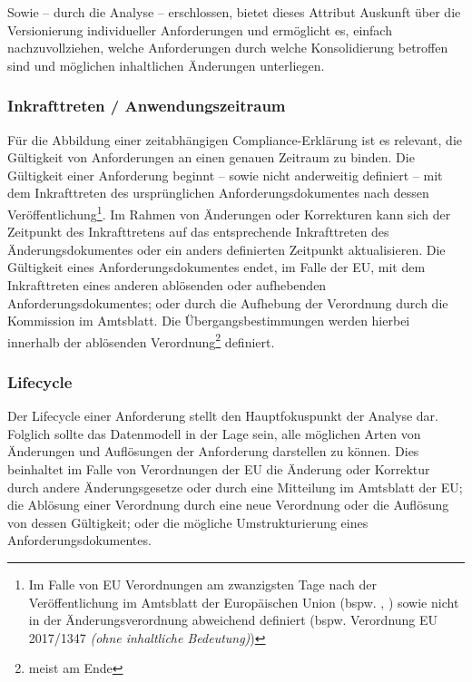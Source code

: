 Sowie -- durch die Analyse -- erschlossen, bietet dieses Attribut Auskunft über die Versionierung individueller Anforderungen und ermöglicht es, einfach nachzuvollziehen, welche Anforderungen durch welche Konsolidierung betroffen sind und möglichen inhaltlichen Änderungen unterliegen.


\subsubsection{Inkrafttreten / Anwendungszeitraum}

Für die Abbildung einer zeitabhängigen Compliance-Erklärung ist es relevant, die Gültigkeit von Anforderungen an einen genauen Zeitraum zu binden.
Die Gültigkeit einer Anforderung beginnt -- sowie nicht anderweitig definiert -- mit dem Inkrafttreten des ursprünglichen Anforderungsdokumentes nach dessen Veröffentlichung\footnote{Im Falle von EU Verordnungen am zwanzigsten Tage nach der Veröffentlichung im Amtsblatt der Europäischen Union (bspw. \cite[Art. 141]{2018R1139}, \cite[Art. 14]{2004R0549}) sowie nicht in der Änderungsverordnung abweichend definiert (bspw. Verordnung EU 2017/1347 \textit{(ohne inhaltliche Bedeutung)})}.
Im Rahmen von Änderungen oder Korrekturen kann sich der Zeitpunkt des Inkrafttretens auf das entsprechende Inkrafttreten des Änderungsdokumentes oder ein anders definierten Zeitpunkt  aktualisieren.\cite{eu_consolidation}
Die Gültigkeit eines Anforderungsdokumentes endet, im Falle der EU, mit dem Inkrafttreten eines anderen ablösenden oder aufhebenden Anforderungsdokumentes; oder durch die Aufhebung der Verordnung durch die Kommission im Amtsblatt. 
Die Übergangsbestimmungen werden hierbei innerhalb der ablösenden Verordnung\footnote{meist am Ende} definiert.

\pagebreak

\subsubsection{Lifecycle}

Der Lifecycle einer Anforderung stellt den Hauptfokuspunkt der Analyse dar. 
Folglich sollte das Datenmodell in der Lage sein, alle möglichen Arten von Änderungen und Auflösungen der Anforderung darstellen zu können.
Dies beinhaltet im Falle von Verordnungen der EU die Änderung oder Korrektur durch andere Änderungsgesetze oder durch eine Mitteilung im Amtsblatt der EU; die Ablösung einer Verordnung durch eine neue Verordnung oder die Auflösung von dessen Gültigkeit; oder die mögliche Umstrukturierung eines Anforderungsdokumentes.


